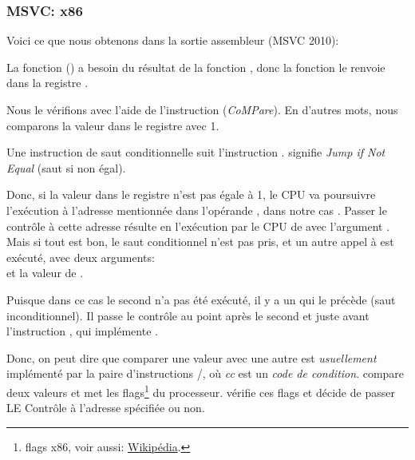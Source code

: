 \subsubsection{MSVC: x86}

Voici ce que nous obtenons dans la sortie assembleur (MSVC 2010):



La fonction  (\main) a besoin du résultat de la fonction
, donc la fonction  le renvoie
dans la registre \EAX.

Nous le vérifions avec l'aide de l'instruction  (\emph{CoMPare}).
En d'autres mots, nous comparons la valeur dans le registre \EAX avec 1.

Une instruction de saut conditionnelle \JNE suit l'instruction \CMP. \JNE signifie
\emph{Jump if Not Equal} (saut si non égal).

Donc, si la valeur dans le registre \EAX n'est pas égale à 1, le \ac{CPU} va poursuivre
l'exécution à l'adresse mentionnée dans l'opérande \JNE, dans notre cas .
Passer le contrôle à cette adresse résulte en l'exécution par le \ac{CPU} de
\printf avec l'argument .
Mais si tout est bon, le saut conditionnel n'est pas pris, et un autre appel à \printf
est exécuté, avec deux arguments:\\
 et la valeur de .

Puisque dans ce cas le second \printf n'a pas été exécuté, il y a un \JMP qui le précède (saut inconditionnel).
Il passe le contrôle au point après le second \printf et juste avant l'instruction , qui implémente .

Donc, on peut dire que comparer une valeur avec une autre est \emph{usuellement} implémenté
par la paire d'instructions \CMP/\Jcc, où \emph{cc} est un \emph{code de condition}.
\CMP compare deux valeurs et met les flags\footnote{flags x86, voir aussi: \href{http://en.wikipedia.org/wiki/FLAGS_register_(computing)}{Wikipédia}.}
du processeur.
\Jcc vérifie ces flags et décide de passer LE Contrôle à l'adresse spécifiée ou non.

